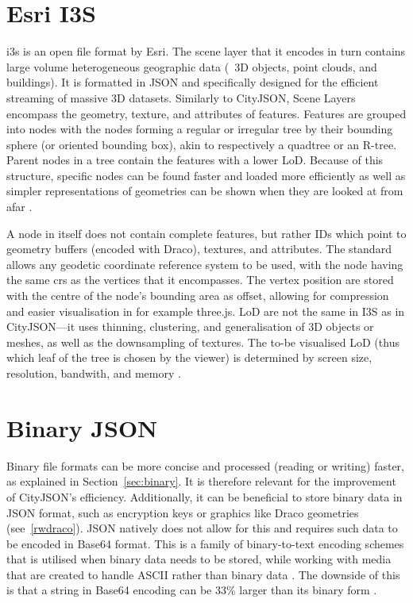 \section{Esri I3S}
\label{sec:i3s}
\ac{i3s} \citep{i3sspecsmain} is an open file format by Esri.
The scene layer that it encodes in turn contains large volume heterogeneous geographic data (\eg\ 3D objects, point clouds, and buildings). 
It is formatted in JSON and specifically designed for the efficient streaming of massive 3D datasets. 
Similarly to CityJSON, Scene Layers encompass the geometry, texture, and attributes of features. 
Features are grouped into nodes with the nodes forming a regular or irregular tree by their bounding sphere (or oriented bounding box), akin to respectively a quadtree or an R-tree.
Parent nodes in a tree contain the features with a lower LoD.
Because of this structure, specific nodes can be found faster and loaded more efficiently as well as simpler representations of geometries can be shown when they are looked at from afar \citep{i3sspecs, i3sspecsmain}.

A node in itself does not contain complete features, but rather IDs which point to geometry buffers (encoded with Draco), textures, and attributes.
The standard allows any geodetic coordinate reference system to be used, with the node having the same \ac{crs} as the vertices that it encompasses.
The vertex position are stored with the centre of the node's bounding area as offset, allowing for compression and easier visualisation in for example three.js.
LoD are not the same in I3S as in CityJSON---it uses thinning, clustering, and generalisation of 3D objects or meshes, as well as the downsampling of textures.
The to-be visualised LoD (thus which leaf of the tree is chosen by the viewer) is determined by screen size, resolution, bandwith, and memory \citep{i3sspecsmain, i3sspecs}.




\section{Binary JSON}
Binary file formats can be more concise and processed (reading or writing) faster, as explained in Section~\ref{sec:binary}.
It is therefore relevant for the improvement of CityJSON's efficiency.
Additionally, it can be beneficial to store binary data in JSON format, such as encryption keys or graphics like Draco geometries (see~\ref{rwdraco}).
JSON natively does not allow for this and requires such data to be encoded in Base64 format.
This is a family of binary-to-text encoding schemes that is utilised when binary data needs to be stored, while working with media that are created to handle ASCII rather than binary data \citep{cborurl}.
The downside of this is that a string in Base64 encoding can be 33\% larger than its binary form \citep{Mozilla2020}.

